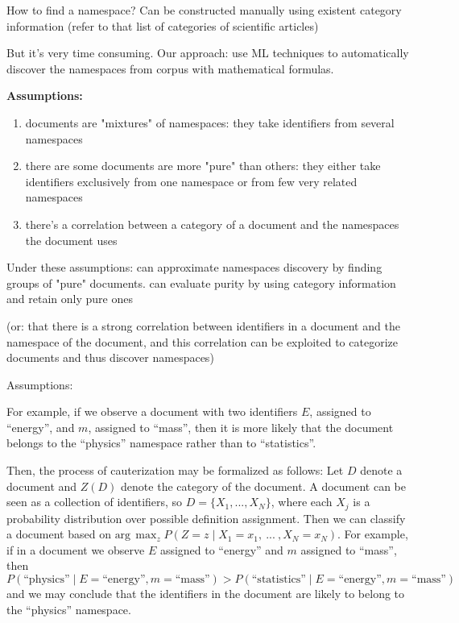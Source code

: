 How to find a namespace? Can be constructed manually using existent category information
(refer to that list of categories of scientific articles)

But it's very time consuming. Our approach: use ML techniques to automatically discover
the namespaces from corpus with mathematical formulas.



\textbf{Assumptions:}


\begin{enumerate}
 \item documents are "mixtures" of namespaces: they take identifiers from several namespaces
 \item there are some documents are more "pure" than others: they either take identifiers exclusively from one namespace or from few very related namespaces
 \item there's a correlation between a category of a document and the namespaces
the document uses
\end{enumerate}


Under these assumptions: can approximate namespaces discovery by finding groups of "pure" documents. can evaluate purity by using category information and retain only pure ones

(or: that there is a strong correlation between identifiers in
a document and the namespace of the document, and this correlation can be exploited to
categorize documents and thus discover namespaces)

Assumptions:


For example, if we observe a document with
two identifiers $E$, assigned to ``energy'', and $m$, assigned to ``mass'', then it is more
likely that the document belongs to the ``physics'' namespace rather than to ``statistics''.

Then, the process of cauterization may be formalized as follows: 
Let $D$ denote a document and $Z(D)$ denote the category of the document. A document can be 
seen as a collection of identifiers, so $D = \{ X_1, ..., X_N \}$, where 
each $X_j$ is a probability distribution over possible definition assignment. 
Then we can classify a document based on 
$\text{arg} \, \max_z P(Z=z \mid X_1=x_1, \ ... \ ,  X_N=x_N)$. For example, if in a document 
we observe $E$ assigned to ``energy'' and $m$ assigned to ``mass'', then 
$P(\text{``physics''} \mid E=\text{``energy''}, m=\text{``mass''}) > P(\text{``statistics''} \mid E=\text{``energy''}, m=\text{``mass''})$ 
and we may conclude that the identifiers in the document are likely to belong to 
the ``physics'' namespace.

